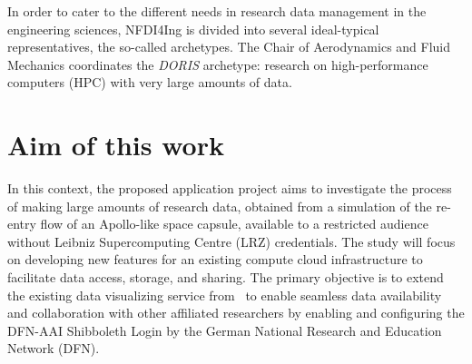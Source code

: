In order to cater to the different needs in research data management in the
engineering sciences, NFDI4Ing is divided into several ideal-typical
representatives, the so-called archetypes. The Chair of Aerodynamics and Fluid
Mechanics coordinates the \textit{DORIS} archetype: research on high-performance
computers (HPC) with very large amounts of data. 

\section{Aim of this work}
In this context, the proposed application project aims to investigate the
process of making large amounts of research data, obtained from a simulation of
the re-entry flow of an Apollo-like space capsule, available to a restricted
audience without Leibniz Supercomputing Centre (LRZ) credentials. The study will
focus on developing new features for an existing compute cloud infrastructure to
facilitate data access, storage, and sharing. The primary objective is to extend
the existing data visualizing service from~\cite{nowak2024pvw} to enable
seamless data availability and collaboration with other affiliated researchers
by enabling and configuring the DFN-AAI Shibboleth Login by the German National
Research and Education Network (DFN). \\

